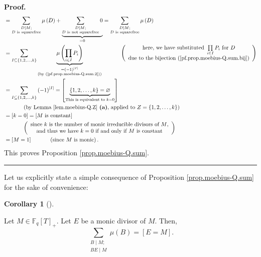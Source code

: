 \documentclass[numbers=enddot,12pt,final,onecolumn,notitlepage]{scrartcl}%
\theoremstyle{definition}
\newtheorem{coro}[theo]{Corollary}
\newenvironment{corollary}[1][]
{\begin{coro}[#1]\begin{leftbar}}
{\end{leftbar}\end{coro}}
\newenvironment{proof}[1][Proof]{\noindent\textbf{#1.} }{\ \rule{0.5em}{0.5em}}
\let\sumnonlimits\sum
\let\prodnonlimits\prod
\renewcommand{\sum}{\sumnonlimits\limits}
\renewcommand{\prod}{\prodnonlimits\limits}
\begin{document}
\begin{proof}
\begin{align*}
&  =\sum_{\substack{D\mid M;\\D\text{ is squarefree}}}\mu\left(  D\right)
+\underbrace{\sum_{\substack{D\mid M;\\D\text{ is not squarefree}}}0}%
_{=0}=\sum_{\substack{D\mid M;\\D\text{ is squarefree}}}\mu\left(  D\right) \\
&  =\sum_{I\subseteq\left\{  1,2,\ldots,k\right\}  }\underbrace{\mu\left(
\prod_{i\in I}P_{i}\right)  }_{\substack{=\left(  -1\right)  ^{\left\vert
I\right\vert }\\\text{(by (\ref{pf.prop.moebius-Q.sum.2}))}}%
}\ \ \ \ \ \ \ \ \ \ \left(
\begin{array}
[c]{c}%
\text{here, we have substituted }\prod_{i\in I}P_{i}\text{ for }D\\
\text{due to the bijection (\ref{pf.prop.moebius-Q.sum.bij})}%
\end{array}
\right) \\
&  =\sum_{I\subseteq\left\{  1,2,\ldots,k\right\}  }\left(  -1\right)
^{\left\vert I\right\vert }=\left[  \underbrace{\left\{  1,2,\ldots,k\right\}
=\varnothing}_{\text{This is equivalent to }k=0}\right] \\
&  \ \ \ \ \ \ \ \ \ \ \left(  \text{by Lemma \ref{lem.moebius-Q.Z}
\textbf{(a)}, applied to }Z=\left\{  1,2,\ldots,k\right\}  \right) \\
&  =\left[  k=0\right]  =\left[  M\text{ is constant}\right] \\
&  \ \ \ \ \ \ \ \ \ \ \left(
\begin{array}
[c]{c}%
\text{since }k\text{ is the number of monic irreducible divisors of }%
M\text{,}\\
\text{and thus we have }k=0\text{ if and only if }M\text{ is constant}%
\end{array}
\right) \\
&  =\left[  M=1\right]  \ \ \ \ \ \ \ \ \ \ \left(  \text{since }M\text{ is
monic}\right)  .
\end{align*}
This proves Proposition \ref{prop.moebius-Q.sum}.
\end{proof}

Let us explicitly state a simple consequence of Proposition
\ref{prop.moebius-Q.sum} for the sake of convenience:

\begin{corollary}
\label{cor.moebius-Q.sum-rel}Let $M\in\mathbb{F}_{q}\left[  T\right]  _{+}$.
Let $E$ be a monic divisor of $M$. Then,%
\[
\sum_{\substack{B\mid M;\\BE\mid M}}\mu\left(  B\right)  =\left[  E=M\right]
.
\]

\end{corollary}
\end{document}
